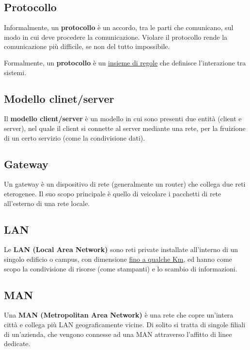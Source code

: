 \documentclass{article}
\begin{document}
        \subsection{Protocollo}
        Informalmente, un \textbf{protocollo} è un accordo, tra le parti che comunicano, sul modo in cui deve
        procedere la comunicazione. Violare il protocollo rende la comunicazione più difficile, se non
        del tutto impossibile.\newline

        Formalmente, un \textbf{protocollo} è un \underline{insieme di regole} che definisce l’interazione tra sistemi.

        \subsection{Modello clinet/server}
        Il \textbf{modello client/server} è un modello in cui sono presenti due entità (client e server), nel
        quale il client si connette al server mediante una rete, per la fruizione di un certo servizio (come
        la condivisione dati).

        \subsection{Gateway}
        Un gateway è un dispositivo di rete (generalmente un router) che collega due reti eterogenee.
        Il suo scopo principale è quello di veicolare i pacchetti di rete all’esterno di una rete locale.

        \subsection{LAN}
        Le \textbf{LAN (Local Area Network)} sono reti private installate all’interno di un singolo edificio o
        campus, con dimensione \underline{fino a qualche Km}, ed hanno come scopo la condivisione di risorse
        (come stampanti) e lo scambio di informazioni.

        \subsection{MAN}
        Una \textbf{MAN (Metropolitan Area Network)} è una rete che copre un’intera città e collega più LAN
        geograficamente vicine. Di solito si tratta di singole filiali di un’azienda, che vengono connesse
        ad una MAN attraverso l’affitto di linee dedicate.
\end{document}
